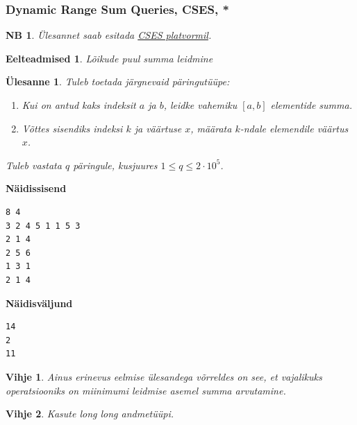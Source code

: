 \documentclass{trkut}
\newtheorem*{prereq}{Eelteadmised}
\newtheorem*{extra}{NB}
\newtheorem*{vihje}{Vihje}
\newtheorem*{Text}{Ülesanne}
\begin{document}
\subsubsection{Dynamic Range Sum Queries, CSES, *}
\begin{extra}
Ülesannet saab esitada \href{https://cses.fi/problemset/task/1648}{CSES platvormil}.
\end{extra}
\begin{prereq}
Lõikude puul summa leidmine
\end{prereq}
\begin{Text}
Tuleb toetada järgnevaid päringutüüpe:
\begin{enumerate}
\item Kui on antud kaks indeksit $a$ ja $b$, leidke vahemiku $[a,b]$ elementide summa.
\item Võttes sisendiks indeksi $k$ ja väärtuse $x$, määrata $k$-ndale elemendile väärtus $x$.
\end{enumerate}

Tuleb vastata $q$ päringule, kusjuures $1\le q\le 2\cdot 10^5$.

\parencite{sum}
\end{Text}



\textbf{Näidissisend}

\begin{verbatim}
8 4
3 2 4 5 1 1 5 3
2 1 4
2 5 6
1 3 1
2 1 4
\end{verbatim}

\textbf{Näidisväljund}

\begin{verbatim}
14
2
11
\end{verbatim}


\begin{vihje}
Ainus erinevus eelmise ülesandega võrreldes on see, et vajalikuks operatsiooniks on miinimumi leidmise asemel summa arvutamine.
\end{vihje}

\begin{vihje}
Kasute long long andmetüüpi.
\end{vihje}
\end{document}
